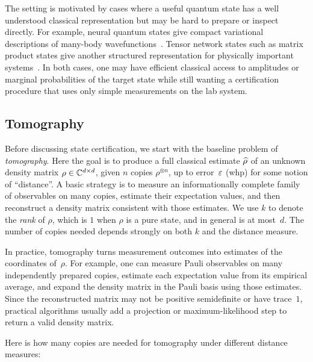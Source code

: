 The setting is motivated by cases where a useful quantum state has a well understood classical representation but may be hard to prepare or inspect directly. For example, neural quantum states give compact variational descriptions of many-body wavefunctions~\cite{carleo2017solving}. Tensor network states such as matrix product states give another structured representation for physically important systems~\cite{verstraete2006matrix}. In both cases, one may have efficient classical access to amplitudes or marginal probabilities of the target state while still wanting a certification procedure that uses only simple measurements on the lab system.

\subsection{Tomography}
Before discussing state certification, we start with the baseline problem of \emph{tomography}. Here the goal is to produce a full classical estimate $\widehat{\rho}$ of an unknown density matrix $\rho \in \mathbb{C}^{d \times d}$, given $n$ copies $\rho^{\otimes n}$, up to error~$\varepsilon$ (whp) for some notion of ``distance''. A basic strategy is to measure an informationally complete family of observables on many copies, estimate their expectation values, and then reconstruct a density matrix consistent with those estimates. We use $k$ to denote the \emph{rank} of $\rho$, which is $1$ when $\rho$ is a pure state, and in general is at most~$d$. The number of copies needed depends strongly on both $k$ and the distance measure.

In practice, tomography turns measurement outcomes into estimates of the coordinates of~$\rho$. For example, one can measure Pauli observables on many independently prepared copies, estimate each expectation value from its empirical average, and expand the density matrix in the Pauli basis using those estimates. Since the reconstructed matrix may not be positive semidefinite or have trace~$1$, practical algorithms usually add a projection or maximum-likelihood step to return a valid density matrix.

Here is how many copies are needed for tomography under different distance measures:

